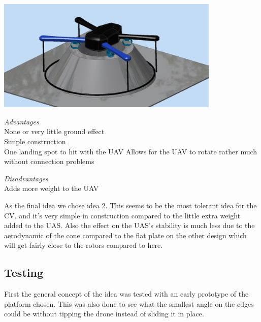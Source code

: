 \begin{center}
	\includegraphics[width=0.8\textwidth]{imgs/mockup_idea_1}
\end{center}
\begin{center}
	\begin{minipage}[t]{0.45\textwidth}
		\begin{flushleft}
			\emph{Advantages}\\
			None or very little ground effect\\
			Simple construction\\
			One landing spot to hit with the UAV
			Allows for the UAV to rotate rather much without connection problems
		\end{flushleft}
	\end{minipage}
	\begin{minipage}[t]{0.45\textwidth}
		\begin{flushleft}
			\emph{Disadvantages}\\
			Adds more weight to the UAV
		\end{flushleft}
	\end{minipage}
\end{center}

As the final idea we chose idea 2. This seems to be the most tolerant idea for the CV. and it's very simple in construction compared to the little extra weight added to the UAS. Also the effect on the UAS's stability is much less due to the aerodynamic of the cone compared to the flat plate on the other design which will get fairly close to the rotors compared to here.

\subsection{Testing}
First the general concept of the idea was tested with an early prototype of the platform chosen. This was also done to see what the smallest angle on the edges could be without tipping the drone instead of sliding it in place.

